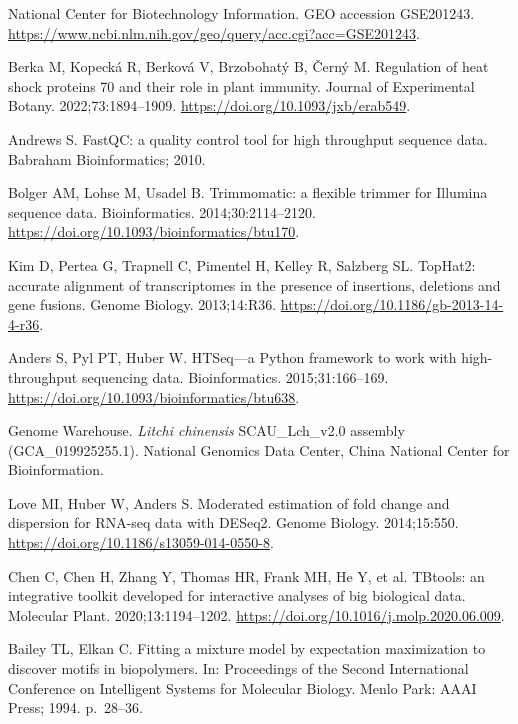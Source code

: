 \documentclass[referee,pdflatex,sn-basic,Numbered]{sn-jnl}
\begin{document}
\begin{enumerate}[label={[\arabic*]},itemsep=2pt,leftmargin=2.6em]
\item National Center for Biotechnology Information. GEO accession GSE201243. \url{https://www.ncbi.nlm.nih.gov/geo/query/acc.cgi?acc=GSE201243}.

\item Berka M, Kopeck\'a R, Berkov\'a V, Brzobohat\'y B, \v{C}ern\'y M. Regulation of heat shock proteins 70 and their role in plant immunity. Journal of Experimental Botany. 2022;73:1894--1909. \url{https://doi.org/10.1093/jxb/erab549}.

\item Andrews S. FastQC: a quality control tool for high throughput sequence data. Babraham Bioinformatics; 2010.

\item Bolger AM, Lohse M, Usadel B. Trimmomatic: a flexible trimmer for Illumina sequence data. Bioinformatics. 2014;30:2114--2120. \url{https://doi.org/10.1093/bioinformatics/btu170}.

\item Kim D, Pertea G, Trapnell C, Pimentel H, Kelley R, Salzberg SL. TopHat2: accurate alignment of transcriptomes in the presence of insertions, deletions and gene fusions. Genome Biology. 2013;14:R36. \url{https://doi.org/10.1186/gb-2013-14-4-r36}.

\item Anders S, Pyl PT, Huber W. HTSeq---a Python framework to work with high-throughput sequencing data. Bioinformatics. 2015;31:166--169. \url{https://doi.org/10.1093/bioinformatics/btu638}.

\item Genome Warehouse. \textit{Litchi chinensis} SCAU\_Lch\_v2.0 assembly (GCA\_019925255.1). National Genomics Data Center, China National Center for Bioinformation.

\item Love MI, Huber W, Anders S. Moderated estimation of fold change and dispersion for RNA-seq data with DESeq2. Genome Biology. 2014;15:550. \url{https://doi.org/10.1186/s13059-014-0550-8}.

\item Chen C, Chen H, Zhang Y, Thomas HR, Frank MH, He Y, et al. TBtools: an integrative toolkit developed for interactive analyses of big biological data. Molecular Plant. 2020;13:1194--1202. \url{https://doi.org/10.1016/j.molp.2020.06.009}.

\item Bailey TL, Elkan C. Fitting a mixture model by expectation maximization to discover motifs in biopolymers. In: Proceedings of the Second International Conference on Intelligent Systems for Molecular Biology. Menlo Park: AAAI Press; 1994. p.~28--36.


\end{enumerate}
\end{document}
